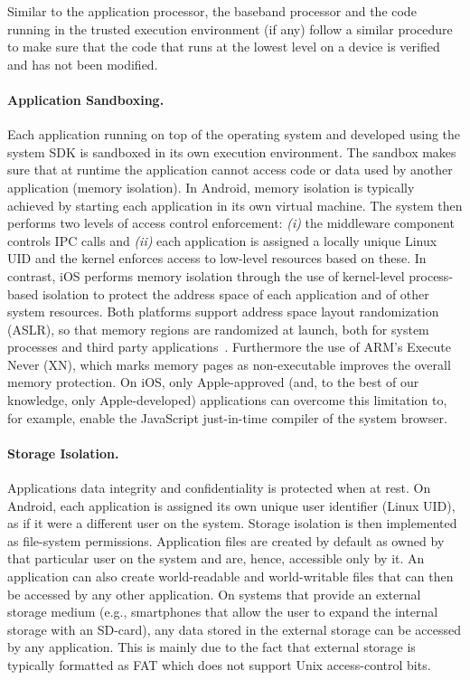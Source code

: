 Similar to the application processor, the baseband processor and the code running in the trusted execution environment (if any) follow a similar procedure to make sure that the code that runs at the lowest level on a device is verified and has not been modified.

\paragraph{Application Sandboxing.} Each application running on top of the
operating system and developed using the system SDK is sandboxed in its own
execution environment. The sandbox makes sure that at runtime the application
cannot access code or data used by another application (memory isolation). In
Android, memory isolation is typically achieved by starting each application in
its own virtual machine. The system then performs two levels of access control
enforcement: \emph{(i)} the middleware component controls IPC calls and
\emph{(ii)} each application is assigned a locally unique Linux UID and the
kernel enforces access to low-level resources based on these. In contrast, iOS
performs memory isolation through the use of kernel-level process-based
isolation to protect the address space of each application and of other system
resources. Both platforms support address space layout randomization (ASLR), so
that memory regions are randomized at launch, both for system processes and
third party applications~\cite{androidsecurity,applesecurity}. Furthermore the
use of ARM's Execute Never (XN), which marks memory pages as non-executable
improves the overall memory protection. On iOS, only Apple-approved (and, to
the best of our knowledge, only Apple-developed) applications can overcome this
limitation to, for example, enable the JavaScript just-in-time compiler of the
system browser.

\paragraph{Storage Isolation.} Applications data integrity and confidentiality
is protected when at rest. On Android, each application is assigned its own
unique user identifier (Linux UID), as if it were a different user on the
system. Storage isolation is then implemented as file-system permissions.
Application files are created by default as owned by that particular user on
the system and are, hence, accessible only by it. An application can also
create world-readable and world-writable files that can then be accessed by any
other application. On systems that provide an external storage medium (e.g.,
smartphones that allow the user to expand the internal storage with an
SD-card), any data stored in the external storage can be accessed by any
application. This is mainly due to the fact that external storage is typically
formatted as FAT which does not support Unix access-control bits.

